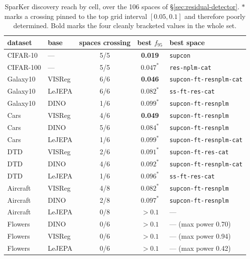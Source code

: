 \documentclass{article}
\newcommand{\best}[1]{\textbf{#1}}
\begin{document}
\begin{table}[t]\centering\small
\begin{tabular}{llccl}
\toprule
dataset & base & spaces crossing & best $f_{95}$ & best space \\
\midrule
CIFAR-10 & --- & 5/5 & \best{0.019} & \texttt{supcon} \\
CIFAR-100 & --- & 5/5 & $0.047^*$ & \texttt{res-nplm-cat} \\
Galaxy10 & VISReg & 6/6 & \best{0.046} & \texttt{supcon-ft-resnplm-cat} \\
Galaxy10 & LeJEPA & 6/6 & $0.082^*$ & \texttt{ss-ft-res-cat} \\
Galaxy10 & DINO & 1/6 & $0.099^*$ & \texttt{supcon-ft-resnplm} \\
Cars & VISReg & 4/6 & \best{0.049} & \texttt{supcon-ft-resnplm} \\
Cars & DINO & 5/6 & $0.084^*$ & \texttt{supcon-ft-resnplm} \\
Cars & LeJEPA & 1/6 & $0.099^*$ & \texttt{supcon-ft-resnplm-cat} \\
DTD & VISReg & 2/6 & $0.091^*$ & \texttt{supcon-ft-res-cat} \\
DTD & DINO & 4/6 & $0.092^*$ & \texttt{supcon-ft-resnplm-cat} \\
DTD & LeJEPA & 1/6 & $0.096^*$ & \texttt{ss-ft-res-cat} \\
Aircraft & VISReg & 4/8 & $0.082^*$ & \texttt{supcon-ft-resnplm} \\
Aircraft & DINO & 2/8 & $0.097^*$ & \texttt{supcon-ft-resnplm} \\
Aircraft & LeJEPA & 0/8 & $>0.1$ & --- \\
Flowers & DINO & 0/6 & $>0.1$ & --- (max power 0.70) \\
Flowers & VISReg & 0/6 & $>0.1$ & --- (max power 0.94) \\
Flowers & LeJEPA & 0/6 & $>0.1$ & --- (max power 0.42) \\
\bottomrule
\end{tabular}
\caption{SparKer discovery reach by cell, over the 106 spaces of
\S\ref{sec:residual-detector}. $*$ marks a crossing pinned to the top grid
interval $[0.05,0.1]$ and therefore poorly determined. Bold marks the four
cleanly bracketed values in the whole set.}
\label{tab:reach}
\end{table}
\end{document}
